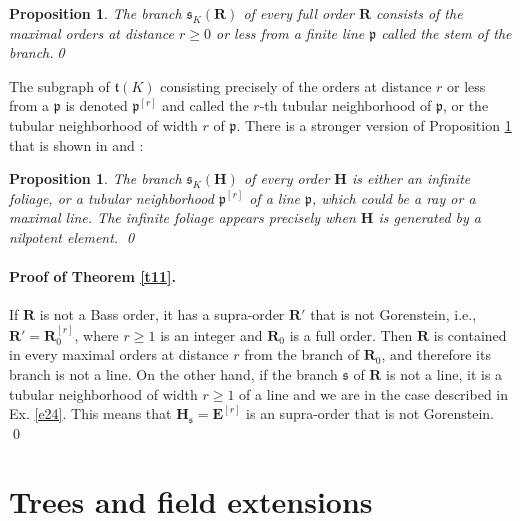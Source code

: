 \documentclass{amsart}
\newtheorem{proposition}[theorem]{Proposition}
\theoremstyle{definition}
\newcommand\Ra{\mathbf R}
\newcommand\Ha{\mathbf{H}}
\newcommand\Ea{\mathbf{E}}
\begin{document}
\begin{proposition}\label{p22}
    The branch $\mathfrak{s}_K(\Ra)$ 
    of every full order 
    $\Ra$ consists of
    the maximal orders at distance 
    $r\geq0$ or less from a 
    finite line $\mathfrak{p}$ called 
    the stem of the
    branch.\qed
\end{proposition}

The subgraph of $\mathfrak{t}(K)$ 
consisting precisely of
the orders at distance $r$ or less from a  
$\mathfrak{p}$ is denoted
$\mathfrak{p}^{[r]}$ and called the $r$-th 
tubular neighborhood of $\mathfrak{p}$, or the 
tubular neighborhood of width $r$ of 
$\mathfrak{p}$.
There is a stronger version of 
Proposition \ref{p22} that is shown 
in \cite[Prop. 5.3]{Eichler2} and 
\cite[Prop. 5.4]{Eichler2}:

\begin{proposition}\label{p23}
    The branch $\mathfrak{s}_K(\Ha)$ of 
    every order $\Ha$ 
    is either an infinite foliage, or a tubular 
    neighborhood $\mathfrak{p}^{[r]}$ of a line
    $\mathfrak{p}$, which could  be a ray
    or a maximal line. The infinite foliage
    appears precisely when $\Ha$ is generated by
    a nilpotent element.
    \qed
\end{proposition}



\paragraph{Proof of Theorem \ref{t11}.}
    If $\Ra$ is not a Bass order, it has a
    supra-order $\Ra'$ that is not Gorenstein,
    i.e., $\Ra'=\Ra_0^{[r]}$, where $r\geq1$
    is an integer and $\Ra_0$ is a full order. 
    Then $\Ra$ is contained in every maximal 
    orders at distance $r$ from the branch of
    $\Ra_0$, and therefore its branch
    is not a line.
    On the other hand, if the branch
    $\mathfrak{s}$ of $\Ra$ is not a line,
    it is a tubular neighborhood of width $r\geq1$
    of a line and we are in the case described
    in Ex. \ref{e24}. This means that $\Ha_{\mathfrak{s}}=\Ea^{[r]}$ is an supra-order that is not Gorenstein.
\qed


\section{Trees and field extensions}
\end{document}
